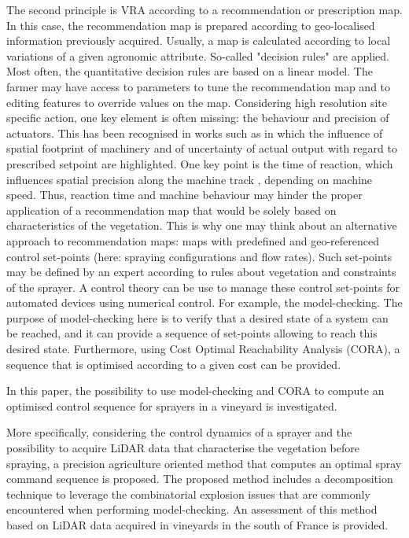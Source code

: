 \documentclass[preprint,3p,times,twocolumn]{elsarticle}
\begin{document}
The second principle is VRA according to a recommendation or prescription map. In this case, the recommendation map is prepared according to geo-localised information previously acquired. Usually, a map is calculated according to local variations of a given agronomic attribute. So-called "decision rules" are applied. Most often, the quantitative decision rules are based on a linear model. The farmer may have access to parameters to tune the recommendation map and to editing features to override values on the map. Considering high resolution site specific action, one key element is often missing: the behaviour and precision of actuators. This has been recognised in works such as \cite{roudier2011TOI} in which the influence of spatial footprint of machinery and of uncertainty of actual output with regard to prescribed setpoint are highlighted. One key point is the time of reaction, which influences spatial precision along the machine track \cite{Chan2004601}, depending on machine speed. Thus, reaction time and machine behaviour may hinder the proper application of a recommendation map that would be solely based on characteristics of the vegetation. This is why one may think about an alternative approach to recommendation maps: maps with predefined and geo-referenced control set-points (here: spraying configurations and flow rates). Such set-points may be defined by an expert according to rules about vegetation and constraints of the sprayer. A control theory can be use to manage these control set-points for automated devices using numerical control. For example, the model-checking. The purpose of model-checking here is to verify that a desired state of a system can be reached, and it can provide a sequence of set-points allowing to reach this desired state. Furthermore, using Cost Optimal Reachability Analysis (CORA), a sequence that is optimised according to a given cost can be provided.

In this paper, the possibility to use model-checking and CORA to compute an optimised control sequence for sprayers in a vineyard is investigated.

More specifically, considering the control dynamics of a sprayer and the possibility to acquire LiDAR data that characterise the vegetation before spraying, a precision agriculture oriented method that computes an optimal spray command sequence is proposed. The proposed method includes a decomposition technique to leverage the combinatorial explosion issues that are commonly encountered when performing model-checking.
An assessment of this method based on LiDAR data acquired in vineyards in the south of France is provided.
\end{document}
